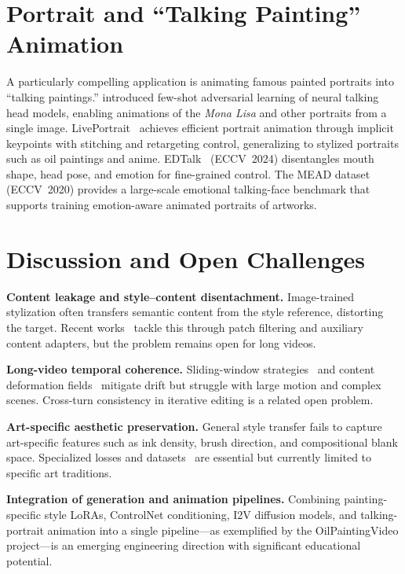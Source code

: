\documentclass[letterpaper,twocolumn,10pt]{article}
\begin{document}
\section{Portrait and ``Talking Painting'' Animation}
\label{sec:portrait}

A particularly compelling application is animating famous painted portraits into
``talking paintings.'' \citet{zakharov2019fewshot} introduced few-shot adversarial
learning of neural talking head models, enabling animations of the \textit{Mona Lisa}
and other portraits from a single image. LivePortrait~\cite{guo2024liveportrait}
achieves efficient portrait animation through implicit keypoints with stitching and
retargeting control, generalizing to stylized portraits such as oil paintings and anime.
EDTalk~\cite{tan2024edtalk} (ECCV~2024) disentangles mouth shape, head pose, and emotion
for fine-grained control. The MEAD dataset~\cite{wang2020mead} (ECCV~2020) provides a
large-scale emotional talking-face benchmark that supports training emotion-aware
animated portraits of artworks.

\section{Discussion and Open Challenges}
\label{sec:discussion}

\textbf{Content leakage and style--content disentachment.} Image-trained stylization
often transfers semantic content from the style reference, distorting the target.
Recent works~\cite{ye2025stylemaster,chen2024artadapter} tackle this through patch
filtering and auxiliary content adapters, but the problem remains open for long videos.

\textbf{Long-video temporal coherence.} Sliding-window strategies~\cite{li2026echostyle}
and content deformation fields~\cite{ouyang2024codef} mitigate drift but struggle with
large motion and complex scenes. Cross-turn consistency in iterative editing is a
related open problem.

\textbf{Art-specific aesthetic preservation.} General style transfer fails to capture
art-specific features such as ink density, brush direction, and compositional blank
space. Specialized losses and datasets~\cite{he2023bitgan,liu2026chipdiff,zhang2025inkspirit}
are essential but currently limited to specific art traditions.

\textbf{Integration of generation and animation pipelines.} Combining painting-specific
style LoRAs, ControlNet conditioning, I2V diffusion models, and talking-portrait
animation into a single pipeline---as exemplified by the OilPaintingVideo project---is
an emerging engineering direction with significant educational potential.
\end{document}
